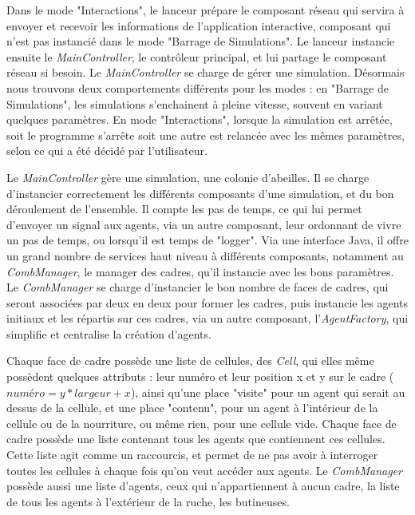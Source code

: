 			 Dans le mode "Interactions", le lanceur prépare le composant réseau qui servira à envoyer et recevoir les informations de l'application interactive, composant qui n'est pas instancié dans le mode "Barrage de Simulations". Le lanceur instancie ensuite le \textit{MainController}, le contrôleur principal, et lui partage le composant réseau si besoin. Le \textit{MainController} se charge de gérer une simulation. Désormais nous trouvons deux comportements différents pour les modes : en "Barrage de Simulations", les simulations s'enchainent à pleine vitesse, souvent en variant quelques paramètres. En mode "Interactions", lorsque la simulation est arrêtée, soit le programme s'arrête soit une autre est relancée avec les mêmes paramètres, selon ce qui a été décidé par l'utilisateur.
			
			Le \textit{MainController} gère une simulation, une colonie d'abeilles. Il se charge d'instancier correctement les différents composants d'une simulation, et du bon déroulement de l'ensemble. Il compte les pas de temps, ce qui lui permet d'envoyer un signal aux agents, via un autre composant, leur ordonnant de vivre un pas de temps, ou lorsqu'il est temps de "logger". Via une interface Java, il offre un grand nombre de services haut niveau à différents composants, notamment au \textit{CombManager}, le manager des cadres, qu'il instancie avec les bons paramètres. Le \textit{CombManager} se charge d'instancier le bon nombre de faces de cadres, qui seront associées par deux en deux pour former les cadres, puis instancie les agents initiaux et les répartis sur ces cadres, via un autre composant, l'\textit{AgentFactory}, qui simplifie et centralise la création d'agents.
			
			Chaque face de cadre possède une liste de cellules, des \textit{Cell}, qui elles même possèdent quelques attributs : leur numéro et leur position x et y sur le cadre ($numéro = y * largeur + x$), ainsi qu'une place "visite" pour un agent qui serait au dessus de la cellule, et une place "contenu", pour un agent à l'intérieur de la cellule ou de la nourriture, ou même rien, pour une cellule vide. Chaque face de cadre possède une liste contenant tous les agents que contiennent ces cellules. Cette liste agit comme un raccourcis, et permet de ne pas avoir à interroger toutes les cellules à chaque fois qu'on veut accéder aux agents. Le \textit{CombManager} possède aussi une liste d'agents, ceux qui n'appartiennent à aucun cadre, la liste de tous les agents à l'extérieur de la ruche, les butineuses.
			
